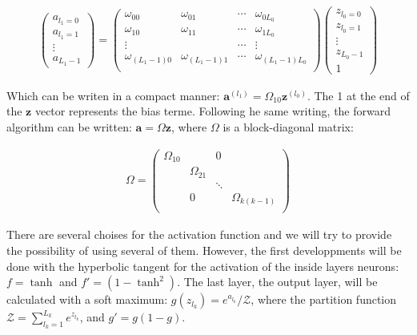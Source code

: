 \documentclass[final, paper=letter,5p,times,twocolumn]{elsarticle}
\begin{document}
\begin{eqnarray*}
  \left(
  \begin{array}{c}
    a_{l_{1} = 0} \\
    a_{l_{1} = 1} \\
    \vdots \\
    a_{L_{1} - 1}
  \end{array}
  \right) = \left(
  \begin{array}{cccc}
    \omega_{00} & \omega_{01} & \cdots & \omega_{0L_{0}} \\
    \omega_{10} & \omega_{11} & \cdots & \omega_{1L_{0}} \\
    \vdots     &            & \cdots & \vdots \\
    \omega_{(L_{1}-1)0} & \omega_{(L_{1}-1)1} & \cdots & \omega_{(L_{1}-1)L_{0}} \\
  \end{array}
  \right)  \left(
  \begin{array}{c}
    z_{l_{0} = 0} \\
    z_{l_{0} = 1} \\
    \vdots \\
    z_{L_{0} - 1} \\
    1
  \end{array}
  \right)
\end{eqnarray*}

Which can be writen in a compact manner: $\bm{a}^{(l_{1})} = \Omega_{10}\bm{z}^{(l_{0})}$. The 1 at the end of the $\bm{z}$ vector represents the bias terme. Following he same writing, the forward algorithm can be written: $\bm{a} = \Omega\bm{z}$, where $\Omega$ is a block-diagonal matrix:

\begin{eqnarray*}
  \Omega = \left(
  \begin{array}{cccc}
    \Omega_{10} &            & 0      &  \\
               & \Omega_{21} &        &  \\
               &            & \ddots &  \\
               & 0          &        & \Omega_{k(k-1)} \\
  \end{array}
  \right)
\end{eqnarray*}

  There are several choises for the activation function and we will try to provide the possibility of using several of them. However, the first developpments will be done with the hyperbolic tangent for the activation of the inside layers neurons: $f = \tanh$ and $f' = (1 - \tanh^{2})$. The last layer, the output layer, will be calculated with a soft maximum: $g(z_{l_{k}}) = e^{a_{l_{k}}} / \mathcal{Z}$, where the partition function $\mathcal{Z} = \sum_{l_{k} = 1}^{L_{k}} e^{z_{l_{k}}}$, and $g' = g(1 - g)$.
  
\end{document}
